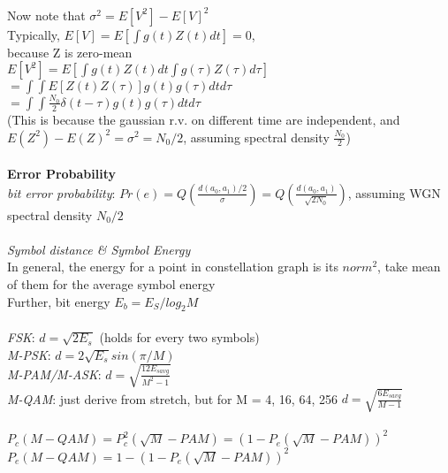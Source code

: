 \documentclass [12pt] {article}
\begin{document}
\begin{spacing}{1.5}
\begin{multicols}{2}
~\\
Now note that $\sigma^2 = E[V^2] - E[V]^2$\\
Typically, $E[V] = E[\int g(t) Z(t) dt ] = 0$, \\
because Z is zero-mean\\
$E[V^2] = E[\int g(t) Z(t) dt \int g(\tau) Z(\tau) d\tau ]$\\
$ =\int \int E[Z(t)Z(\tau)] g(t) g(\tau) dt d\tau $\\
$=\int \int \frac{N_0}{2}\delta(t-\tau) g(t) g(\tau) dt d\tau $\\
(This is because the gaussian r.v. on different time are independent, and $E(Z^2)-E(Z)^2 = \sigma ^2 = N_0/2$, assuming spectral density $\frac{N_0}{2}$)\\
~\\
\textbf{Error Probability}\\
\emph{bit error probability}: $Pr(e) = Q(\frac{d(a_0, a_1)/2}{\sigma})= Q(\frac{d(a_0, a_1)}{\sqrt{2 N_0}})$, assuming WGN spectral density $N_0/2$\\
~\\
\emph{Symbol distance \& Symbol Energy}\\
In general, the energy for a point in constellation graph is its $norm^2$, take mean of them for the average symbol energy\\
Further, bit energy $E_b = E_S / log_2 M$\\
~\\
\emph{FSK}: $d = \sqrt{2E_s}$ (holds for every two symbols)\\
\emph{M-PSK}: $d = 2\sqrt{E_s}sin(\pi / M)$\\
\emph{M-PAM/M-ASK}: $d = \sqrt{\frac{12 E_{savg}}{M^2 -1}}$\\
\emph{M-QAM}: just derive from stretch, but for M = 4, 16, 64, 256 $d = \sqrt{\frac{6E_{savg}}{M-1}}$\\
~\\
$P_c (M-QAM) = P_c^2 (\sqrt{M}-PAM) = (1-P_e(\sqrt{M}-PAM))^2$\\
$P_e (M-QAM)  = 1-(1-P_e(\sqrt{M}-PAM))^2$\\


\end{multicols}
\end{spacing}
\end{document}
